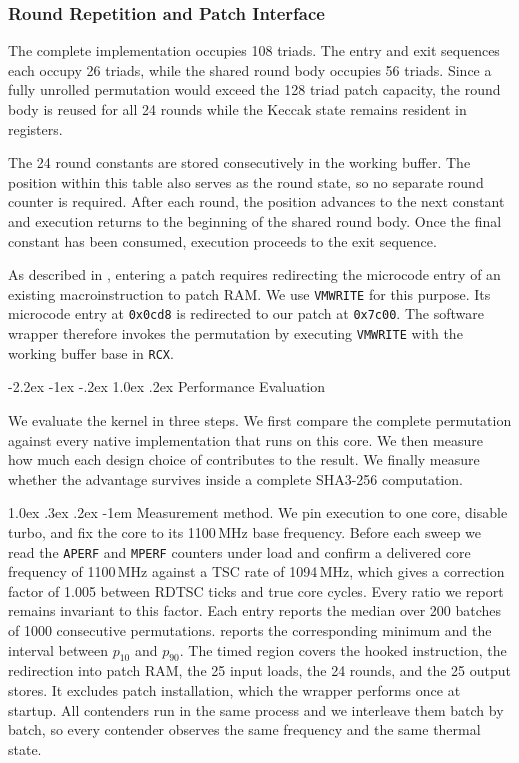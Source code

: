 \documentclass[journal=tches,submission]{iacrtrans}
\makeatletter
\newcommand{\code}[1]{\texttt{#1}}
\newcommand{\uaddr}[1]{\texttt{0x#1}}
\renewcommand\subsection{\@startsection{subsection}{2}{\z@}%
      {-2.2ex \@plus -1ex \@minus -.2ex}%
      {1.0ex \@plus .2ex}%
      {\normalfont\large\bfseries\SS@subsectfont}}
\renewcommand\paragraph{\@startsection{paragraph}{4}{\z@}%
      {1.0ex \@plus .3ex \@minus .2ex}%
      {-1em}%
      {\normalfont\normalsize\bfseries\SS@parafont}}
\makeatother
\begin{document}
\subsubsection{Round Repetition and Patch Interface}
\label{sec:loop}

The complete implementation occupies 108 triads. 
The entry and exit sequences each occupy 26 triads, while the shared round body occupies 56 triads. 
Since a fully unrolled permutation would exceed the 128 triad patch capacity, the round body is reused for all 24 rounds while the Keccak state remains resident in registers.

The 24 round constants are stored consecutively in the working buffer. 
The position within this table also serves as the round state, so no separate round counter is required. 
After each round, the position advances to the next constant and execution returns to the beginning of the shared round body. 
Once the final constant has been consumed, execution proceeds to the exit sequence.

As described in , entering a patch requires redirecting the microcode entry of an existing macroinstruction to patch RAM. 
We use \code{VMWRITE} for this purpose. 
Its microcode entry at \code{0x0cd8} is redirected to our patch at \uaddr{7c00}. 
The software wrapper therefore invokes the permutation by executing \code{VMWRITE} with the working buffer base in \code{RCX}.

\subsection{Performance Evaluation}
\label{sec:keccak-eval}

We evaluate the kernel in three steps.
We first compare the complete permutation against every native implementation that runs on this core.
We then measure how much each design choice of  contributes to the result.
We finally measure whether the advantage survives inside a complete SHA3-256 computation.

\paragraph{Measurement method.}
We pin execution to one core, disable turbo, and fix the core to its 1100\,MHz base frequency.
Before each sweep we read the \code{APERF} and \code{MPERF} counters under load and confirm a delivered core frequency of 1100\,MHz against a TSC rate of 1094\,MHz, which gives a correction factor of 1.005 between RDTSC ticks and true core cycles.
Every ratio we report remains invariant to this factor.
Each entry reports the median over 200 batches of 1000 consecutive permutations.
 reports the corresponding minimum and the interval between $p_{10}$ and $p_{90}$.
The timed region covers the hooked instruction, the redirection into patch RAM, the 25 input loads, the 24 rounds, and the 25 output stores.
It excludes patch installation, which the wrapper performs once at startup.
All contenders run in the same process and we interleave them batch by batch, so every contender observes the same frequency and the same thermal state.
\end{document}
